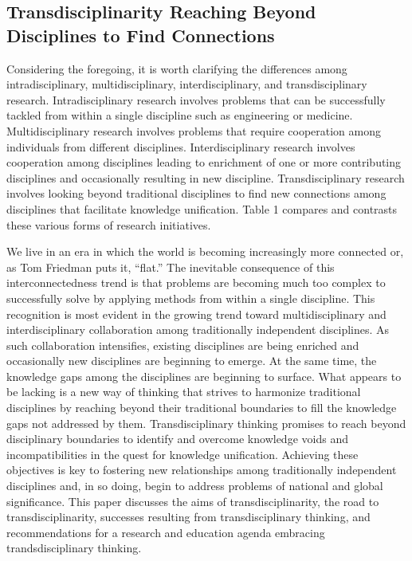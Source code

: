 \subsection{Transdisciplinarity Reaching Beyond Disciplines to Find Connections}

Considering the foregoing, it is worth clarifying the differences among intradisciplinary, multidisciplinary, interdisciplinary, and transdisciplinary research. Intradisciplinary research involves problems that can be successfully tackled from within a single discipline such as engineering or medicine. Multidisciplinary research involves problems that require cooperation among individuals from different disciplines. Interdisciplinary research involves cooperation among disciplines leading to enrichment of one or more contributing disciplines and occasionally resulting in new discipline. Transdisciplinary research involves looking beyond traditional disciplines to find new connections among disciplines that facilitate knowledge unification. Table 1 compares and contrasts these various forms of research initiatives. 

We live in an era in which the world is becoming increasingly more connected or, as Tom Friedman puts it, ``flat.'' The inevitable consequence of this interconnectedness trend is that problems are becoming much too complex to successfully solve by applying methods from within a single discipline. This recognition is most evident in the growing trend toward multidisciplinary and interdisciplinary collaboration among traditionally independent disciplines. As such collaboration intensifies, existing disciplines are being enriched and occasionally new disciplines are beginning to emerge. At the same time, the knowledge gaps among the disciplines are beginning to surface. What appears to be lacking is a new way of thinking that strives to harmonize traditional disciplines by reaching beyond their traditional boundaries to fill the knowledge gaps not addressed by them. Transdisciplinary thinking promises to reach beyond disciplinary boundaries to identify and overcome knowledge voids and incompatibilities in the quest for knowledge unification. Achieving these objectives is key to fostering new relationships among traditionally independent disciplines and, in so doing, begin to address problems of national and global significance. This paper discusses the aims of transdisciplinarity, the road to transdisciplinarity, successes resulting from transdisciplinary thinking, and recommendations for a research and education agenda embracing trandsdisciplinary thinking. 

